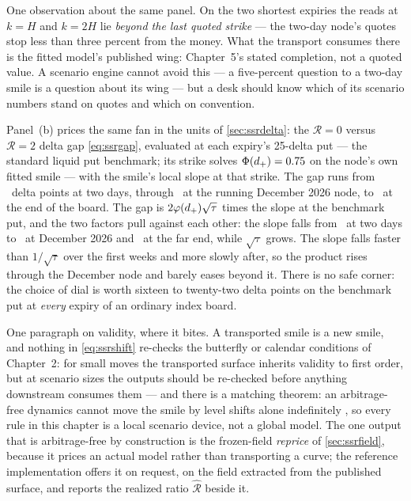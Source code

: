 One observation about the same panel.  On the two shortest expiries
the reads at $k=H$ and $k=2H$ lie \emph{beyond the last quoted
strike} --- the two-day node's quotes stop less than three percent
from the money.  What the transport consumes there is the fitted
model's published wing: Chapter~5's stated completion, not a quoted
value.  A scenario engine cannot avoid this --- a five-percent
question to a two-day smile is a question about its wing --- but a
desk should know which of its scenario numbers stand on quotes and
which on convention.

Panel~(b) prices the same fan in the units of \cref{sec:ssrdelta}:
the $\mathcal{R}=0$ versus $\mathcal{R}=2$ delta gap
\eqref{eq:ssrgap}, evaluated at each expiry's 25-delta put --- the
standard liquid put benchmark; its strike solves
$\Phi(d_+)=0.75$ on the node's own fitted smile --- with the smile's
local slope at that strike.  The gap runs from
\MacSsrScenGapShortPts\ delta points at two days, through
\MacSsrScenGapHeroPts\ at the running December 2026 node, to
\MacSsrScenGapLongPts\ at the end of the board.  The gap is
$2\varphi(d_+)\sqrt{\tau}$ times the slope at the benchmark put, and the
two factors pull against each other: the slope falls from
\MacSsrScenSlopeShort\ at two days to \MacSsrScenSlopeHero\ at
December 2026 and \MacSsrScenSlopeLong\ at the far end, while
$\sqrt\tau$ grows.  The slope falls faster than $1/\sqrt\tau$ over
the first weeks and more slowly after, so the product rises through
the December node and barely eases beyond it.  There is no safe
corner: the choice of
dial is worth sixteen to twenty-two delta points on the benchmark put
at \emph{every} expiry of an ordinary index board.

One paragraph on validity, where it bites.  A transported smile is a
new smile, and nothing in \eqref{eq:ssrshift} re-checks the butterfly
or calendar conditions of Chapter~2: for small moves the transported
surface inherits validity to first order, but at scenario sizes the
outputs should be re-checked before anything downstream consumes them
--- and there is a matching theorem: an arbitrage-free dynamics cannot
move the smile by level shifts alone indefinitely
\citep{RogersTehranchi2010}, so every rule in this chapter is a local
scenario device, not a global model.  The one output that is
arbitrage-free by construction is the frozen-field \emph{reprice} of
\cref{sec:ssrfield}, because it prices an actual model rather than
transporting a curve; the reference implementation offers it on
request, on the field extracted from the published surface, and reports
the realized ratio $\widehat{\mathcal{R}}$ beside it.

